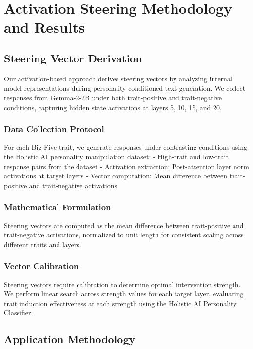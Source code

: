 \section{Activation Steering Methodology and Results}
\label{app:activation-steering}

\subsection{Steering Vector Derivation}

Our activation-based approach derives steering vectors by analyzing internal model representations during personality-conditioned text generation. We collect responses from Gemma-2-2B under both trait-positive and trait-negative conditions, capturing hidden state activations at layers 5, 10, 15, and 20.

\subsubsection{Data Collection Protocol}

For each Big Five trait, we generate responses under contrasting conditions using the Holistic AI personality manipulation dataset:
- High-trait and low-trait response pairs from the dataset
- Activation extraction: Post-attention layer norm activations at target layers
- Vector computation: Mean difference between trait-positive and trait-negative activations

\subsubsection{Mathematical Formulation}

Steering vectors are computed as the mean difference between trait-positive and trait-negative activations, normalized to unit length for consistent scaling across different traits and layers.

\subsubsection{Vector Calibration}

Steering vectors require calibration to determine optimal intervention strength. We perform linear search across strength values for each target layer, evaluating trait induction effectiveness at each strength using the Holistic AI Personality Classifier.

\subsection{Application Methodology}

